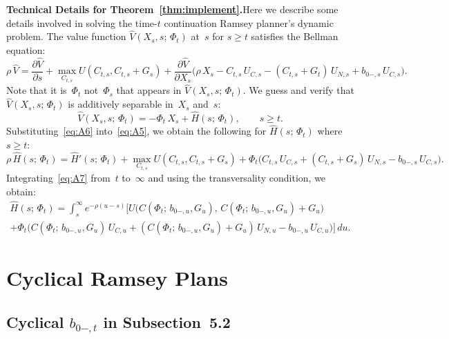 \documentclass[12pt]{article}
\begin{document}
{\medskip
\noindent\textbf{Technical Details for Theorem~\ref{thm:implement}.}\quad Here we describe some details involved in solving the time-$t$ continuation Ramsey planner's dynamic problem. The value function $\widehat{V}(X_s, s;\, \Phi_t)$ at~$s$ for $s \ge t$ satisfies the Bellman equation:
\begin{equation}\label{eq:A5}
\rho\, \widehat{V} = \frac{\partial \widehat{V}}{\partial s} + \max_{C_{t,s}} U(C_{t,s}, C_{t,s}+G_s) + \frac{\partial \widehat{V}}{\partial X_s}\bigl(\rho\, X_s - C_{t,s}\, U_{C,s} - (C_{t,s}+G_t)\, U_{N,s} + b_{0-,s}\, U_{C,s}\bigr).
\end{equation}
Note that it is~$\Phi_t$ not~$\Phi_s$ that appears in $\widehat{V}(X_s, s;\, \Phi_t)$. We guess and verify that $\widehat{V}(X_s, s;\, \Phi_t)$ is additively separable in~$X_s$ and~$s$:
\begin{equation}\label{eq:A6}
\widehat{V}(X_s, s;\, \Phi_t) = -\Phi_t\, X_s + \widehat{H}(s;\, \Phi_t), \qquad s \ge t.
\end{equation}
Substituting~\eqref{eq:A6} into~\eqref{eq:A5}, we obtain the following for $\widehat{H}(s;\, \Phi_t)$ where $s \ge t$:
\begin{equation}\label{eq:A7}
\rho\, \widehat{H}(s;\, \Phi_t) = \widehat{H}'(s;\, \Phi_t) + \max_{C_{t,s}} U(C_{t,s}, C_{t,s}+G_s) + \Phi_t\bigl(C_{t,s}\, U_{C,s} + (C_{t,s}+G_s)\, U_{N,s} - b_{0-,s}\, U_{C,s}\bigr).
\end{equation}
Integrating~\eqref{eq:A7} from~$t$ to~$\infty$ and using the transversality condition, we obtain:
\begin{multline}\label{eq:A8}
\widehat{H}(s;\, \Phi_t) = \int_s^\infty e^{-\rho(u-s)}\biggl[U\bigl(C(\Phi_t;\, b_{0-,u}, G_u),\, C(\Phi_t;\, b_{0-,u}, G_u)+G_u\bigr) \\
+ \Phi_t\bigl(C(\Phi_t;\, b_{0-,u}, G_u)\, U_{C,u} + (C(\Phi_t;\, b_{0-,u}, G_u)+G_u)\, U_{N,u} - b_{0-,u}\, U_{C,u}\bigr)\biggr]\, du.
\end{multline}




\section{Cyclical Ramsey Plans}\label{app:cyclical}

\subsection{Cyclical $b_{0-,t}$ in Subsection~5.2}

}
\end{document}
